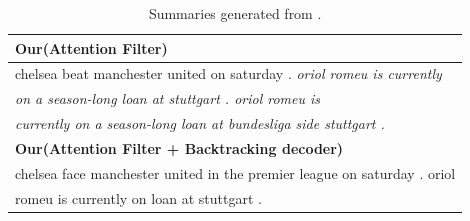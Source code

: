 \begin{table}[th!]
\begin{center}
\scriptsize
\begin{tabular}{|l|}%
\hline \bf Our(Attention Filter)\\
\hline chelsea beat manchester united on saturday . \textit{oriol romeu is currently} \\
       \textit{on a season-long loan at stuttgart . oriol romeu is} \\
	   \textit{currently on a season-long loan at bundesliga side stuttgart .}\\
\hline \bf Our(Attention Filter + Backtracking decoder) \\
\hline chelsea face manchester united in the premier league on saturday . oriol \\
       romeu is currently on loan at stuttgart . \\
\hline
\end{tabular}
\end{center}
\caption{Summaries generated from .}
\label{tab:src_rep}
\end{table}


